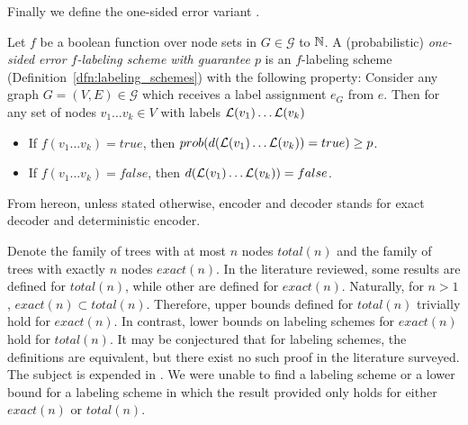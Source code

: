 Finally we define the one-sided error variant  \cite{fraigniaud2009}.

			\begin{definition}\label{dfn:one-sided}
				Let  $f$ be a boolean function over node sets  in  $G \in \mathcal{G}$ to $ \mathbb{N}$.
				 A (probabilistic) \emph{one-sided error $f$-labeling scheme  with guarantee $p$} is an $f$-labeling scheme (Definition~\ref{dfn:labeling_schemes})  with the following property:
				 Consider any graph $G=(V,E) \in \mathcal{G}$ which receives a label assignment $e_G$ from $e$. Then for any set of nodes $v_1\dots v_k\in V$ with labels  $ \mathcal{L}(v_1)\dots  \mathcal{L}(v_k) $
				 \begin{itemize}
				 	\item  If  $f(v_1\dots v_k) = true $,  then   $prob(d( \mathcal{L}(v_1)\dots  \mathcal{L}(v_k)) = true) \geq p$. 
				 	\item If  $f(v_1\dots v_k) = false$, then $d( \mathcal{L}(v_1)\dots  \mathcal{L}(v_k)) = false$.    
				 \end{itemize}
			\end{definition}
			
	From hereon, unless stated otherwise, encoder and decoder stands for exact decoder and deterministic encoder.
		
		Denote the family of trees with at most $n$ nodes $total(n)$ and the family of trees with exactly  $n$ nodes $exact(n)$.
		In the literature reviewed, some  results \cite{Kaplan01,Kannan92} are defined  for $total(n)$,  while other \cite{Alstrup02,Korman07K,gavoille07,Alstrup05} are defined  for $exact(n)$.
		Naturally, for $n>1$, $exact(n) \subset total(n)$.
		Therefore, upper bounds defined for $total(n)$ trivially hold for $exact(n)$.
		In contrast,  lower bounds on labeling schemes for $exact(n)$ hold for $total(n)$.
		It may be conjectured that for labeling schemes, the  definitions are equivalent, but  there exist no such proof in the literature surveyed.
		The subject is expended in \cite{Esben13}. 
		We were unable to find a labeling scheme or a lower bound for a labeling scheme in which the result provided only holds for either $exact(n)$  or $total(n)$.



 	
